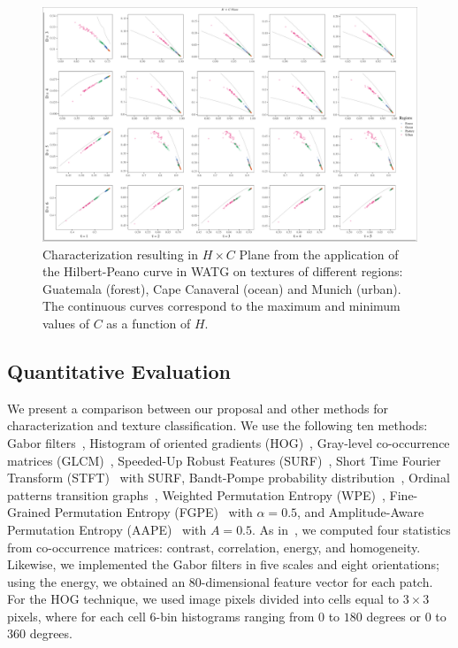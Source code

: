 \documentclass[journal]{IEEEtran}
\begin{document}
	\begin{figure}
		\centering
		\includegraphics[width=1\textwidth]{Figures/WATGHC.pdf}
		\caption{Characterization resulting in $H \times C$ Plane from the application of the Hilbert-Peano curve in WATG on textures of different regions: Guatemala (forest), Cape Canaveral (ocean) and Munich (urban). 
			The continuous curves correspond to the maximum and minimum values of $C$ as a function of $H$.}
		\label{fig:Regions}
	\end{figure}
	
	\subsection{Quantitative Evaluation}
	
	We present a comparison between our proposal and other methods for characterization and texture classification.
	We use the following ten methods: 
	Gabor filters~\cite{weldon1996efficient},  
	Histogram of oriented gradients (HOG)~\cite{dalal2005histograms},
	Gray-level co-occurrence matrices (GLCM)~\cite{kourgli2012texture}, 
	Speeded-Up Robust Features (SURF)~\cite{bay2006surf},
	Short Time Fourier Transform (STFT)~\cite{portnoff1980time} with SURF,
	Bandt-Pompe probability distribution~\cite{Bandt2002Permutation}, 
	Ordinal patterns transition graphs~\cite{Borges2019Transition},
	Weighted Permutation Entropy (WPE)~\cite{Fadlallah2013Weightedpermutation},
	Fine-Grained Permutation Entropy (FGPE)~\cite{xiao2009fine} with $\alpha = 0.5$, and
	Amplitude-Aware Permutation Entropy (AAPE)~\cite{azami2016amplitude} with $A = 0.5$.
	As in~\cite{guan2019covariance}, 
	we computed four statistics from co-occurrence matrices: contrast, correlation, energy, and homogeneity.
	Likewise, we implemented the Gabor filters in five scales and eight orientations; using the energy, we obtained an $80$-dimensional feature vector for each patch.
	For the HOG technique, we used image pixels divided into cells equal to $3 \times 3$ pixels, where for each cell 6-bin histograms ranging from $0$ to $180$ degrees or $0$ to $360$ degrees.
	
\end{document}
